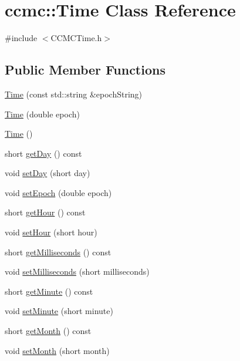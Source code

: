 \hypertarget{classccmc_1_1_time}{\section{ccmc\-:\-:Time Class Reference}
\label{classccmc_1_1_time}
}


{\ttfamily \#include $<$C\-C\-M\-C\-Time.\-h$>$}

\subsection*{Public Member Functions}
\begin{DoxyCompactItemize}
\item 
\hyperlink{classccmc_1_1_time_a763ddfbb61c5e3c89de19d474df83925}{Time} (const std\-::string \&epoch\-String)
\item 
\hyperlink{classccmc_1_1_time_a6c2d0426c9f564a1ac65a6965ff244eb}{Time} (double epoch)
\item 
\hyperlink{classccmc_1_1_time_a6cae04a7873180db02921a6f7d5b8d79}{Time} ()
\item 
short \hyperlink{classccmc_1_1_time_ad7bb606aa958aff81f571ce93b9f3c26}{get\-Day} () const 
\item 
void \hyperlink{classccmc_1_1_time_aa9de7a701b5c9ecbf2b79aadf60cf754}{set\-Day} (short day)
\item 
void \hyperlink{classccmc_1_1_time_a13ac1b91c6d906cf6b116e1f0b7fd08d}{set\-Epoch} (double epoch)
\item 
short \hyperlink{classccmc_1_1_time_a685b4bb32ab9525d3484a9f70833bf34}{get\-Hour} () const 
\item 
void \hyperlink{classccmc_1_1_time_afe8e5bc96dcbecc80a2ace52a08f4724}{set\-Hour} (short hour)
\item 
short \hyperlink{classccmc_1_1_time_ab4941ef0134eea8c757ccec87cd1f9df}{get\-Milliseconds} () const 
\item 
void \hyperlink{classccmc_1_1_time_a660c43e3c4881d97011a625eecfaee1a}{set\-Milliseconds} (short milliseconds)
\item 
short \hyperlink{classccmc_1_1_time_a7edc08ff8d6b060e4315c8544f66ae32}{get\-Minute} () const 
\item 
void \hyperlink{classccmc_1_1_time_a14044e974d54b1a10870bf0d4a14ce52}{set\-Minute} (short minute)
\item 
short \hyperlink{classccmc_1_1_time_a5b05533618e52a76d07a35bc6cc6d248}{get\-Month} () const 
\item 
void \hyperlink{classccmc_1_1_time_aaff31e00f68086966ed627ad3ffdfe5f}{set\-Month} (short month)

\end{DoxyCompactItemize}
